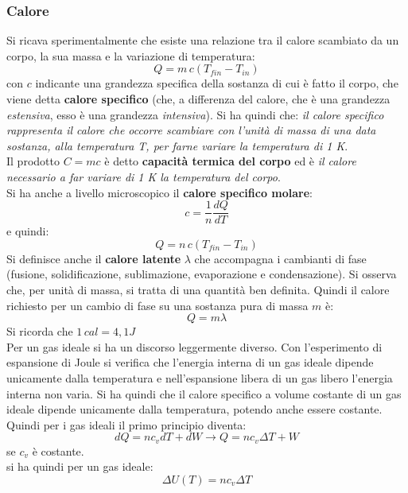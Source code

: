 \documentclass[a4paper,12pt, oneside]{book}
\begin{document}
\subsubsection{Calore}
Si ricava sperimentalmente che esiste una relazione tra il calore scambiato da un corpo, la sua massa e la variazione di temperatura:
$$Q=m\,c(T_{fin}-T_{in})$$
con $c$ indicante una grandezza specifica della sostanza di cui è fatto il corpo, che viene detta \textbf{calore specifico} (che, a differenza del calore, che è una grandezza \textit{estensiva}, esso è una grandezza \textit{intensiva}). Si ha quindi che: \textit{il calore specifico rappresenta il calore che occorre scambiare con l'unità di massa di una data sostanza, alla temperatura T, per farne variare la temperatura di 1 K}.\\
Il prodotto $C=mc$ è detto \textbf{capacità termica del corpo} ed è \textit{il calore necessario a far variare di 1 K la temperatura del corpo}.\\
Si ha anche a livello microscopico il \textbf{calore specifico molare}:
$$c=\frac{1}{n}\frac{dQ}{dT}$$
e quindi:
$$Q=n\,c(T_{fin}-T_{in})$$
Si definisce anche il \textbf{calore latente} $\lambda$ che accompagna i cambianti di fase (fusione, solidificazione, sublimazione, evaporazione e condensazione). Si osserva che, per unità di massa, si tratta di una quantità ben definita. Quindi il calore richiesto per un cambio di fase su una sostanza pura di massa $m$ è:
$$Q=m\lambda$$
Si ricorda che $1\,cal=4,1J$
\\
Per un gas ideale si ha un discorso leggermente diverso. Con l'esperimento di espansione di Joule si verifica che l'energia interna di un gas ideale dipende unicamente dalla temperatura e nell'espansione libera di un gas libero l'energia interna non varia. Si ha quindi che il calore specifico a volume costante di un gas ideale dipende unicamente dalla temperatura, potendo anche essere costante. Quindi per i gas ideali il primo principio diventa:
$$dQ=nc_vdT+dW\longrightarrow Q=nc_v\Delta T+W$$
se $c_v$ è costante.
\\si ha quindi per un gas ideale:
$$\Delta U(T)=nc_v\Delta T$$
\end{document}
